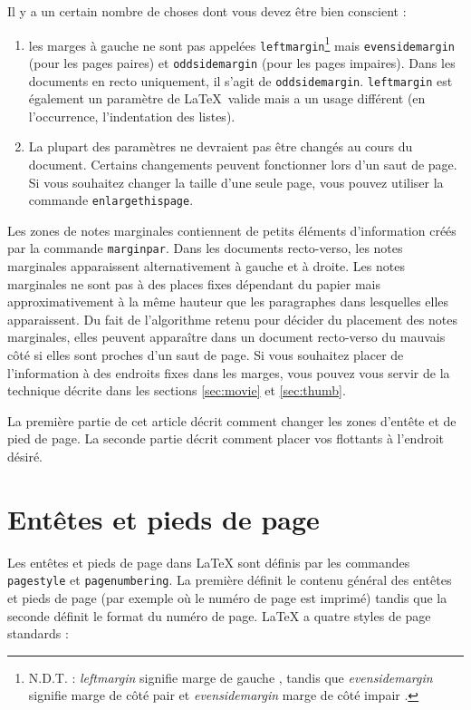 \documentclass[a4paper]{article}
\newcommand{\bs}{\symbol{'134}}
\newcommand{\Cmd}[1]{\texttt{\def\{{\char`\{}\def\}{\char`\}}\bs#1}}
\begin{document}
Il y a un certain nombre de choses dont vous devez être bien conscient :
\begin{enumerate}
\item les marges à gauche ne sont pas appelées \Cmd{leftmargin}\footnote{N.D.T.
  : \emph{leftmargin} signifie \og marge de gauche \fg{}, tandis que 
  \emph{evensidemargin} signifie \og marge de côté pair \fg{} et 
  \emph{evensidemargin} \og marge de côté impair \fg{}.} mais 
  \Cmd{evensidemargin} (pour les pages paires) et \Cmd{oddsidemargin} (pour les
  pages impaires). Dans les documents en recto uniquement, il s'agit de 
  \Cmd{oddsidemargin}. \Cmd{leftmargin} est également un paramètre de \LaTeX\ 
  valide mais a un usage différent (en l'occurrence, l'indentation des listes).
\item La plupart des paramètres ne devraient pas être changés au cours du
  document. Certains changements peuvent fonctionner lors d'un saut de page. Si
  vous souhaitez changer la taille d'une seule page, vous pouvez utiliser la
  commande \Cmd{enlargethispage}. 
\end{enumerate}

Les zones de notes marginales contiennent de petits éléments d'information
créés par la commande \Cmd{marginpar}. Dans les documents recto-verso, les 
notes marginales apparaissent alternativement à gauche et à droite. Les
notes marginales ne sont pas à des places fixes dépendant du papier mais
approximativement à la même hauteur que les paragraphes dans lesquelles
elles apparaissent. Du fait de l'algorithme retenu pour décider du placement
des notes marginales, elles peuvent apparaître dans un document recto-verso
du mauvais côté si elles sont proches d'un saut de page. Si vous souhaitez
placer de l'information à des endroits fixes dans les marges, vous pouvez
vous servir de la technique décrite dans les sections \ref{sec:movie} et
\ref{sec:thumb}.

La première partie de cet article décrit comment changer les zones d'entête et
de pied de page.  La seconde partie décrit comment placer vos flottants à
l'endroit désiré.

\section{Entêtes et pieds de page}

Les entêtes et pieds de page dans \LaTeX{} sont définis par les commandes
\Cmd{pagestyle} et \Cmd{pagenumbering}. La première définit le contenu général
des entêtes et pieds de page (par exemple où le numéro de page est imprimé) 
tandis que la seconde définit le format du numéro de page. 
\LaTeX{} a quatre styles de page standards :
\end{document}
